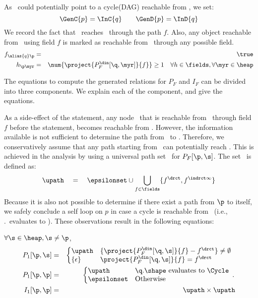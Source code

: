 \begin{enumerate}
  As \p\ could potentially point to a cycle(DAG) reachable
  from \q, we set:
  $$\GenC{p} = \InC{q} \qquad \GenD{p} = \InD{q}$$ We record
  the fact that \q\ reaches \p\ through the path
  $f$. Also, any object reachable from \q\ using field $f$
  is marked as reachable from \p\ through any
  possible field.
{\blue 
\begin{eqnarray*}
  f_{\alias{q}\p} &=& \true \\ %
  {h_{\p\myr}} &=&
  \num{\project{P_F^{\din}[\q,\myr]}{f}} \geq 1\quad
  \forall h \in \fields, \forall \myr \in \heap 
\end{eqnarray*}
}

The equations to compute the generated relations for  $P_F$ and $I_F$
can be divided into three components. We explain each of the
component, and give the equations.

As a side-effect of the statement, any node \s\ that is
reachable from \q\ through field $f$ before the statement,
becomes reachable from \p. However, the information available
is not sufficient to determine the path from \p\ to
\s. Therefore, we conservatively assume that any path
starting from \p\ can potentially reach \s. This is achieved
in the analysis by using a universal path set \upath\ for
$P_F[\p,\s]$. The set \upath\ is defined as:
\[ \upath \quad=\quad \epsilonset \cup \bigcup_{f\in\fields} \{f^{\drct},
f^{\indrct\infty}\} \] Because it is also not possible to determine
if there exist a path from $\p$ to itself,  we safely
conclude a self loop on $p$ in case a cycle is reachable
from \q\ (i.e., \q.\shape\ evaluates to \Cycle). 
These
observations result in the following equations:

{\blue 
$\forall \s \in \heap, \s \not=\p$,
\begin{eqnarray*}
	P_1[\p, \s] &=&  \left\{\begin{array}{@{}ll}
	                        \upath & \{ \project{P_F^{\din}[\q, \s]}{f} - f^{\drct} \} \not= \emptyset \\
				\{ \epsilon \} & \project{P_F^{\din}[\q, \s]}{f} = f^{\drct}
	                       \end{array}\right. \\
	P_1[\p, \p] &=& \left \{ \begin{array}{@{}ll}
	  \upath& \q.\shape \mbox{ evaluates to } \Cycle \\
	  \epsilonset & \mbox{Otherwise}
	\end{array}. \right.   \\
	I_1[\p, \p] &=& \upath \times \upath \\
\end{eqnarray*}
}


\end{enumerate}
